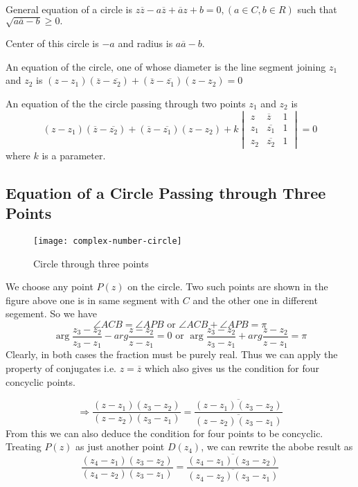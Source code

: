 \noindent General equation of a circle is $z\overline{z} - a\overline{z} + \overline{a}z + b = 0, (a\in C, b\in R)$ such that $\sqrt{a\overline{a} - b}\geq 0.$

\noindent Center of this circle is $-a$ and radius is $a\overline{a} - b.$

\noindent An equation of the circle, one of whose diameter is the line segment joining $z_1$ and $z_2$ is $(z - z_1)(\overline{z} - \overline{z_2}) + (\overline{z} - \overline{z_1})(z - z_2) = 0$

\noindent An equation of the the circle passing through two points $z_1$ and $z_2$ is
$$(z - z_1)(\overline{z} - \overline{z_2}) + (\overline{z} - \overline{z_1})(z - z_2) + k \begin{vmatrix}z & \overline{z} & 1\\z_1
  & \overline{z_1} & 1\\z_2 & \overline{z_2} & 1 \end{vmatrix} = 0$$
where $k$ is a parameter.

\subsection{Equation of a Circle Passing through Three Points}
\begin{figure}[h]
  \begin{center}
    \texttt{[image: complex-number-circle]}
    \caption{Circle through three points}
  \end{center}
\end{figure}
We choose any point $P(z)$ on the circle. Two such points are shown in the figure above one is in same segment with $C$
and the other one in different segement. So we have
$$\angle ACB = \angle APB\text{~or~}\angle ACB + \angle APB = \pi$$
$$\arg\frac{z_3 - z_2}{z_3 - z_1} - arg\frac{z - z_2}{z - z_1} = 0\text{~or~}\arg\frac{z_3 - z_2}{z_3 - z_1} + arg\frac{z - z_2}{z - z_1} = \pi$$
Clearly, in both cases the fraction must be purely real. Thus we can apply the property of conjugates i.e. $z = \overline{z}$ which
also gives us the condition for four concyclic points.

$$\Rightarrow \frac{(z - z_1)(z_3 - z_2)}{(z - z_2)(z_3 - z_1)} = \frac{\overline{(z - z_1)(z_3 - z_2)}}{\overline{(z - z_2)(z_3 -
    z_1)}}$$
From this we can also deduce the condition for four points to be concyclic. Treating $P(z)$ as just another point $D(z_4)$, we can
rewrite the abobe result as
$$\frac{(z_4 - z_1)(z_3 - z_2)}{(z_4 - z_2)(z_3 - z_1)} = \frac{\overline{(z_4 - z_1)(z_3 - z_2)}}{\overline{(z_4 -
    z_2)(z_3 - z_1)}}$$

